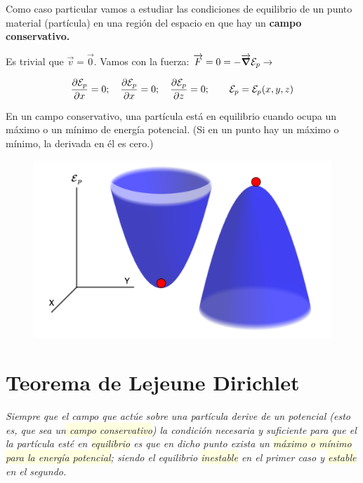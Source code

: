 Como caso particular vamos a estudiar las condiciones de equilibrio de un punto material (partícula) en una región del espacio en que hay un \textbf{campo conservativo.}


Es trivial que $\vec v=\vec 0$. Vamos con la fuerza: $\overrightarrow{F}=0=-\overrightarrow{\grad}{\mathcal E_p} \to $

$$\displaystyle \pdv{\mathcal E_p}{x}=0;\quad \pdv{\mathcal E_p}{x}=0;\quad \pdv{\mathcal E_p}{z}=0;\qquad \mathcal E_p=\mathcal E_p(x,y,z)$$

\begin{miparrafodestacado}
	En un campo conservativo, una partícula está en equilibrio cuando ocupa un máximo o un mínimo de energía potencial. (Si en un punto hay un máximo o mínimo, la derivada en él es cero.)
\end{miparrafodestacado}






\begin{figure}[H]
	\centering
	\includegraphics[width=.75\textwidth]{imagenes/imagenes05/T05IM02.png}
\end{figure}

\section{Teorema de Lejeune Dirichlet}
\label{Lejeune-Dirichlet}

\emph{Siempre que el campo que actúe sobre una partícula derive de un potencial (esto es, que sea un\colorbox{LightYellow}{ campo conservativo}) la condición necesaria y suficiente para que el la partícula esté en \colorbox{LightYellow}{equilibrio} es que en dicho punto exista un \colorbox{LightYellow}{máximo o mínimo para la energía potencial}; siendo el equilibrio \colorbox{LightYellow}{inestable} en el primer caso y \colorbox{LightYellow}{estable} en el segundo.}

